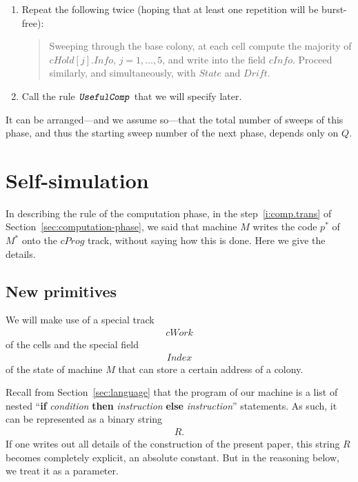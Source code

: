 \documentclass[12pt]{memoir}
\newcommand{\fld}[1]{\ensuremath{\textit{#1}}}
\newcommand{\rul}[1]{\ensuremath{\texttt{\slshape #1\/}}}
\newcommand{\Drift}{\fld{Drift}}
\newcommand{\cHold}{\fld{cHold}}
\newcommand{\Index}{\fld{Index}}
\newcommand{\Info}{\fld{Info}}
\newcommand{\cInfo}{\fld{cInfo}}
\newcommand{\cProg}{\fld{cProg}}
\newcommand{\State}{\fld{State}}
\newcommand{\cWork}{\fld{cWork}}
\newcommand{\UsefulComp}{\rul{UsefulComp}}
\begin{document}
\begin{enumerate}
\begin{enumerate}
        \end{enumerate}

      \item Repeat the following twice (hoping that at least
        one repetition will be burst-free):

          \begin{quote}
            Sweeping through the base colony,
            at each cell compute the majority of \( \cHold[j].\Info \), \( j=1,\dots,5 \),
            and write into the field \( \cInfo \).
            Proceed similarly, and simultaneously, with \( \State \) and \( \Drift \).
          \end{quote}

       \item Call the rule \( \UsefulComp \) that we will specify later.
  \end{enumerate}

It can be arranged---and we assume so---that the total number of sweeps of this
phase, and thus the starting sweep number of the next phase,
depends only on \( Q \).

\section{Self-simulation}\label{sec:self-simulation}

In describing the rule of the computation phase,
in the step~\ref{i:comp.trans} of Section~\ref{sec:computation-phase},
we said that machine \( M \) writes the code \( p^{*} \)
of \( M^{*} \) onto the \( \cProg \) track, without saying how this is done.
Here we give the details.

\subsection{New primitives}

We will make use of a special track
\begin{align*}
   \cWork
 \end{align*}
of the cells and the special field
\begin{align*}
   \Index
 \end{align*}
of the state of machine \( M \) that can store a certain address of a colony.

Recall from Section~\ref{sec:language} that the program
of our machine is a list of nested
``\textbf{if} \emph{condition} \textbf{then} \emph{instruction}
\textbf{else} \emph{instruction}''
statements.
As such, it can be represented as a binary string 
 \begin{align*}
   R.
 \end{align*}
If one writes out all details of the construction of the present paper, this string \( R \)
becomes completely explicit, an absolute constant.
But in the reasoning below, we treat it as a parameter.
\end{document}
